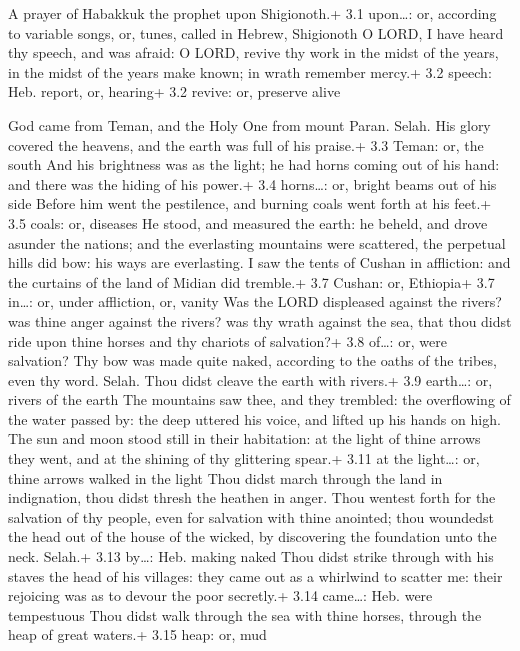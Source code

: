  A prayer of Habakkuk the prophet upon Shigionoth.+ 3.1
upon\ldots: or, according to variable songs, or, tunes, called in
Hebrew, Shigionoth  O LORD, I have heard thy speech, and was
afraid: O LORD, revive thy work in the midst of the years, in the midst
of the years make known; in wrath remember mercy.+ 3.2 speech: Heb.
report, or, hearing+ 3.2 revive: or, preserve alive

 God came from Teman, and the Holy One from mount Paran.
Selah. His glory covered the heavens, and the earth was full of his
praise.+ 3.3 Teman: or, the south  And his brightness was as
the light; he had horns coming out of his hand: and there was the hiding
of his power.+ 3.4 horns\ldots: or, bright beams out of his side
 Before him went the pestilence, and burning coals went
forth at his feet.+ 3.5 coals: or, diseases  He stood, and
measured the earth: he beheld, and drove asunder the nations; and the
everlasting mountains were scattered, the perpetual hills did bow: his
ways are everlasting.  I saw the tents of Cushan in
affliction: and the curtains of the land of Midian did tremble.+ 3.7
Cushan: or, Ethiopia+ 3.7 in\ldots: or, under affliction, or, vanity
 Was the LORD displeased against the rivers? was thine anger
against the rivers? was thy wrath against the sea, that thou didst ride
upon thine horses and thy chariots of salvation?+ 3.8 of\ldots: or, were
salvation?  Thy bow was made quite naked, according to the
oaths of the tribes, even thy word. Selah. Thou didst cleave the earth
with rivers.+ 3.9 earth\ldots: or, rivers of the earth  The
mountains saw thee, and they trembled: the overflowing of the water
passed by: the deep uttered his voice, and lifted up his hands on high.
 The sun and moon stood still in their habitation: at the
light of thine arrows they went, and at the shining of thy glittering
spear.+ 3.11 at the light\ldots: or, thine arrows walked in the light
 Thou didst march through the land in indignation, thou
didst thresh the heathen in anger.  Thou wentest forth for
the salvation of thy people, even for salvation with thine anointed;
thou woundedst the head out of the house of the wicked, by discovering
the foundation unto the neck. Selah.+ 3.13 by\ldots: Heb. making naked
 Thou didst strike through with his staves the head of his
villages: they came out as a whirlwind to scatter me: their rejoicing
was as to devour the poor secretly.+ 3.14 came\ldots: Heb. were
tempestuous  Thou didst walk through the sea with thine
horses, through the heap of great waters.+ 3.15 heap: or, mud

